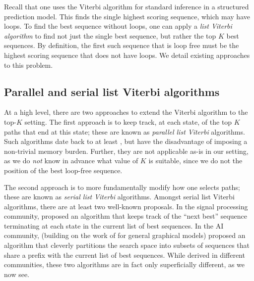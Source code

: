 

Recall that one uses the Viterbi algorithm for standard inference in a structured prediction model.
This finds the single highest scoring sequence, which may have loops.
To find the best sequence without loops, one can apply a \emph{list Viterbi algorithm}
to find not just the single best sequence,
but rather the top $K$ best sequences.
By definition, the first such sequence that is loop free must be the highest scoring sequence that does not have loops.
We detail existing approaches to this problem.

%
\subsection{Parallel and serial list Viterbi algorithms}

At a high level, there are two approaches to extend the Viterbi algorithm to the top-$K$ setting.
The first approach is to keep track, at each state, of the top $K$ paths that end at this state; these are known as \emph{parallel list Viterbi} algorithms.
Such algorithms date back to at least \citet{Forney:1973},
but have the disadvantage of imposing a non-trivial memory burden.
Further, they are not applicable as-is in our setting, as we do \emph{not} know in advance what value of $K$ is suitable,
since we do not the position of the best loop-free sequence.

The second approach is to more fundamentally modify how one selects paths; these are known as \emph{serial list Viterbi} algorithms.
Amongst serial list Viterbi algorithms, there are at least two well-known proposals.
In the signal processing community, \citet{seshadri1994list} proposed an algorithm that keeps track of the ``next best'' sequence terminating at each state in the current list of best sequences.
In the AI community, \citet{nilsson2001sequentially} (building on the work of \citet{Nilsson:1998} for general graphical models) proposed an algorithm that cleverly partitions the search space into subsets of sequences that share a prefix with the current list of best sequences.
While derived in different communities, these two algorithms are in fact only superficially different, as we now see.

